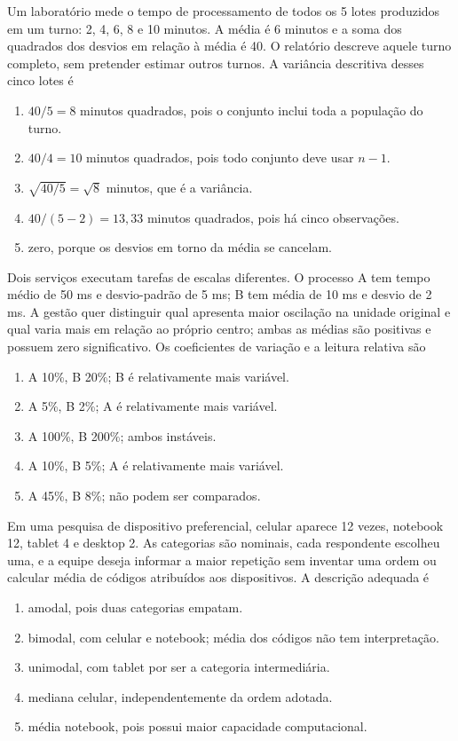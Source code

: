 \TextoBase Um laboratório mede o tempo de processamento de todos os 5 lotes produzidos em um turno: 2, 4, 6, 8 e 10 minutos. A média é 6 minutos e a soma dos quadrados dos desvios em relação à média é 40. O relatório descreve aquele turno completo, sem pretender estimar outros turnos.
\FonteDidatica
\Comando A variância descritiva desses cinco lotes é
\begin{enumerate}[label=\Alph*)]
\item $40/5=8$ minutos quadrados, pois o conjunto inclui toda a população do turno.
\item $40/4=10$ minutos quadrados, pois todo conjunto deve usar $n-1$.
\item $\sqrt{40/5}=\sqrt8$ minutos, que é a variância.
\item $40/(5-2)=13{,}33$ minutos quadrados, pois há cinco observações.
\item zero, porque os desvios em torno da média se cancelam.
\end{enumerate}
\TextoBase Dois serviços executam tarefas de escalas diferentes. O processo A tem tempo médio de 50 ms e desvio-padrão de 5 ms; B tem média de 10 ms e desvio de 2 ms. A gestão quer distinguir qual apresenta maior oscilação na unidade original e qual varia mais em relação ao próprio centro; ambas as médias são positivas e possuem zero significativo.
\FonteDidatica
\Comando Os coeficientes de variação e a leitura relativa são
\begin{enumerate}[label=\Alph*)]\item A 10\%, B 20\%; B é relativamente mais variável.\item A 5\%, B 2\%; A é relativamente mais variável.\item A 100\%, B 200\%; ambos instáveis.\item A 10\%, B 5\%; A é relativamente mais variável.\item A 45\%, B 8\%; não podem ser comparados.\end{enumerate}

\TextoBase Em uma pesquisa de dispositivo preferencial, celular aparece 12 vezes, notebook 12, tablet 4 e desktop 2. As categorias são nominais, cada respondente escolheu uma, e a equipe deseja informar a maior repetição sem inventar uma ordem ou calcular média de códigos atribuídos aos dispositivos.
\FonteDidatica
\Comando A descrição adequada é
\begin{enumerate}[label=\Alph*)]\item amodal, pois duas categorias empatam.\item bimodal, com celular e notebook; média dos códigos não tem interpretação.\item unimodal, com tablet por ser a categoria intermediária.\item mediana celular, independentemente da ordem adotada.\item média notebook, pois possui maior capacidade computacional.\end{enumerate}


